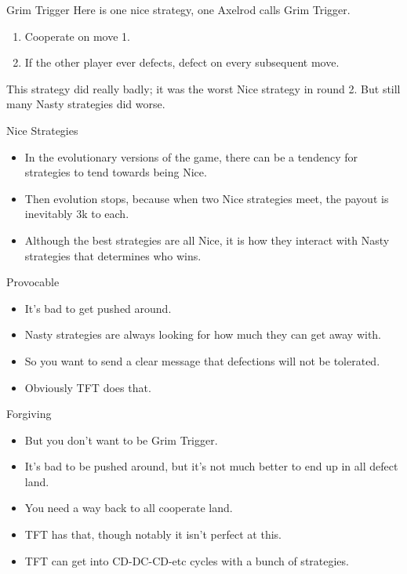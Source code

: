 \documentclass[
  ignorenonframetext,
]{beamer}
\providecommand{\tightlist}{%
  \setlength{\itemsep}{0pt}\setlength{\parskip}{0pt}}
\begin{document}
\begin{frame}{Grim Trigger}
\protect\hypertarget{grim-trigger}{}
Here is one nice strategy, one Axelrod calls Grim Trigger.

\begin{enumerate}
\tightlist
\item
  Cooperate on move 1.
\item
  If the other player ever defects, defect on every subsequent move.
\end{enumerate}

This strategy did really badly; it was the worst Nice strategy in round
2. But still many Nasty strategies did worse.
\end{frame}

\begin{frame}{Nice Strategies}
\protect\hypertarget{nice-strategies}{}
\begin{itemize}
\tightlist
\item
  In the evolutionary versions of the game, there can be a tendency for
  strategies to tend towards being Nice.
\item
  Then evolution stops, because when two Nice strategies meet, the
  payout is inevitably 3k to each.
\item
  Although the best strategies are all Nice, it is how they interact
  with Nasty strategies that determines who wins.
\end{itemize}
\end{frame}

\begin{frame}{Provocable}
\protect\hypertarget{provocable}{}
\begin{itemize}
\tightlist
\item
  It's bad to get pushed around.
\item
  Nasty strategies are always looking for how much they can get away
  with.
\item
  So you want to send a clear message that defections will not be
  tolerated.
\item
  Obviously TFT does that.
\end{itemize}
\end{frame}

\begin{frame}{Forgiving}
\protect\hypertarget{forgiving}{}
\begin{itemize}
\tightlist
\item
  But you don't want to be Grim Trigger.
\item
  It's bad to be pushed around, but it's not much better to end up in
  all defect land.
\item
  You need a way back to all cooperate land.
\item
  TFT has that, though notably it isn't perfect at this.
\item
  TFT can get into CD-DC-CD-etc cycles with a bunch of strategies.
\end{itemize}
\end{frame}
\end{document}
